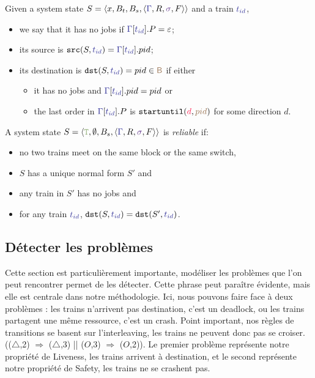 \documentclass[runningheads]{llncs}
\newcommand{\tuple}[1]{\ensuremath{\langle #1\rangle}}
\newcommand{\dirFmt}[1]{{\color{dircolor} #1}}
\newcommand{\posFmt}[1]{{\color{poscolor}{#1}}}
\newcommand{\blocks}{{\posFmt{\mathsf{B}}}}
\newcommand{\swFmt}[1]{{\color{swcolor}{#1}}}
\newcommand{\switches}{\ensuremath{\swFmt{\sigma}}}
\newcommand{\trainFmt}[1]{{\color{traincolor} #1}}
\newcommand{\trainSeq}{\trainFmt{\Gamma\xspace}}
\newcommand{\tid}[1]{\ensuremath{\trainFmt{t_{#1}}}}
\newcommand{\su}[2]{{\mbox{$\mathtt{startuntil}(\dirFmt{#1}, \posFmt{#2})$}}\xspace}
\newcommand{\emptyTrainProg}{\varepsilon}
\newcommand{\regulator}{\ensuremath{R}}
\newcommand{\signals}{\ensuremath{F}}
\newcommand{\stateTuple}[4]{\tuple{#1, #2, #3, #4}}
\newcommand{\guardFmt}[1]{{\color{guardcolor} \ensuremath{\mathtt{#1}}}}
\newcommand{\guardT}{\guardFmt{T}}
\newcommand{\bufferFmt}[1]{#1}
\newcommand{\bufTrain}{\ensuremath{\bufferFmt{B_t}}\xspace}
\newcommand{\bufSig}{\ensuremath{\bufferFmt{B_s}}\xspace}
\newcommand{\redTuple}[4]{\ensuremath{\tuple{#1, \bufferFmt{#2}, \bufferFmt{#3}, #4}}}
\begin{document}
Given a system state  $S = \redTuple{x}{\bufTrain}{\bufSig}{\stateTuple{\trainSeq{}}{\regulator}{\switches}{\signals}}$ and a train $\tid{id}$, 
\begin{itemize}
	\item   we say that it has no jobs if  $\trainSeq{}[\tid{id}].P = \emptyTrainProg$;
	\item its source is $\mathtt{src}(S, \tid{id}) = \trainSeq{}[\tid{id}].pid$;
	\item its destination is $\mathtt{dst}(S, \tid{id}) = pid \in \blocks $ if either
	\begin{itemize}
		\item  it has no jobs and  $\trainSeq{}[\tid{id}].pid = pid$  or
		\item  the last order in  $\trainSeq{}[\tid{id}].P$ is $\su{d}{pid}$ for some direction $d$.
	\end{itemize}
\end{itemize}

A system state $S = \redTuple{\guardT}{\emptyset}{\bufSig}{\stateTuple{\trainSeq{}}{\regulator}{\switches}{\signals}} $  is \emph{reliable} if: 
\begin{itemize}
	\item  no two trains meet on the same block or the same switch, 
	\item $S$ has  a unique normal form $S'$ and 
	\item any train in $S'$ has no jobs and 
	\item for any train $\tid{id}$, $\mathtt{dst}(S, \tid{id}) =  \mathtt{dst}(S', \tid{id})$. 
\end{itemize}

\subsection{Détecter les problèmes}
Cette section est particulièrement importante, modéliser les problèmes que l'on peut rencontrer permet de les détecter.
Cette phrase peut paraître évidente, mais elle est centrale dans notre méthodologie. Ici, nous pouvons faire face à deux problèmes : 
les trains n'arrivent pas destination, c'est un deadlock, ou les trains partagent une même ressource, c'est un crash. 
Point important, nos règles de transitions se basent sur l'interleaving, les trains ne peuvent donc pas se croiser. (($\triangle$,2) $\Rightarrow$ ($\triangle$,3) || ($O$,3) $\Rightarrow$ ($O$,2)).
Le premier problème représente notre propriété de Liveness, les trains arrivent à destination, et le second représente notre propriété de Safety, les trains ne se crashent pas.
\end{document}
